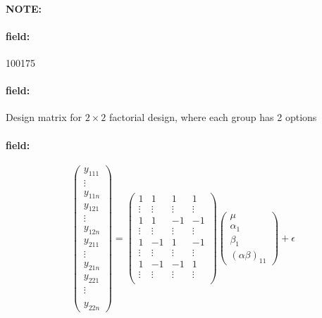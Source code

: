 \documentclass[12pt]{article}
\newenvironment{note}{\paragraph{NOTE:}}{}
\newenvironment{field}{\paragraph{field:}}{}
\begin{document}
\begin{note}
    \begin{field}
        \tiny 100175
    \end{field}
    \begin{field}
        Design matrix for $2 \times 2$ factorial design, where each group has 2 options
    \end{field}
    \begin{field}
        $$ \begin{pmatrix}
              y_{111} \\ \vdots \\ y_{11n} \\ y_{121} \\ \vdots \\
              y_{12n}\\ y_{211}\\ \vdots \\ y_{21n} \\ y_{221} \\ \vdots \\
              \\ y_{22n}
        \end{pmatrix} =
        \begin{pmatrix}
              1 & 1 & 1 & 1\\
              \vdots & \vdots & \vdots & \vdots \\
              1 & 1 & -1 & -1 \\
              \vdots & \vdots & \vdots & \vdots \\
              1 & -1 & 1 & -1 \\
              \vdots & \vdots & \vdots & \vdots \\
              1 & -1 & -1 & 1 \\
              \vdots & \vdots & \vdots & \vdots \\
        \end{pmatrix}
        \begin{pmatrix}
              \mu \\ \alpha_1 \\ \beta_1 \\ (\alpha\beta)_{11}
        \end{pmatrix} + \epsilon $$
    \end{field}
\end{note}
\end{document}
